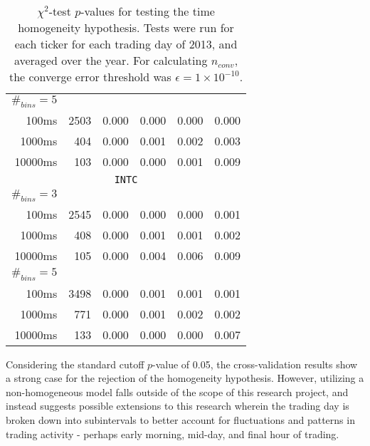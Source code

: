 \begin{sidewaystable}
\begin{tabular}{@{}rrrrrr@{}}
$\#_{bins}=5$ &&&&& \\
100ms &  2503 & 0.000 & 0.000 & 0.000 & 0.000 \\
1000ms &  404 & 0.000 & 0.001 & 0.002 & 0.003 \\
10000ms & 103 & 0.000 & 0.000 & 0.001 & 0.009 \\
\multicolumn{6}{c}{\texttt{INTC}} \\
$\#_{bins}=3$ &&&&& \\
100ms &  2545 & 0.000 & 0.000 & 0.000 & 0.001 \\
1000ms &  408 & 0.000 & 0.001 & 0.001 & 0.002 \\
10000ms & 105 & 0.000 & 0.004 & 0.006 & 0.009 \\
$\#_{bins}=5$ &&&&& \\
100ms &  3498 & 0.000 & 0.001 & 0.001 & 0.001 \\
1000ms &  771 & 0.000 & 0.001 & 0.002 & 0.002 \\
10000ms & 133 & 0.000 & 0.000 & 0.000 & 0.007 \\
\bottomrule
\end{tabular}
\caption{$\chi^2$-test $p$-values for testing the time homogeneity hypothesis. Tests were run for each ticker for each trading day of 2013, and averaged over the year. For calculating $n_{conv}$, the converge error threshold was $\epsilon = 1\times 10^{-10}$.}
\label{tbl:pvalues}
\end{sidewaystable}
Considering the standard cutoff $p$-value of 0.05, the cross-validation results show a strong case for the rejection of the homogeneity hypothesis. However, utilizing a non-homogeneous model falls outside of the scope of this research project, and instead suggests possible extensions to this research wherein the trading day is broken down into subintervals to better account for fluctuations and patterns in trading activity - perhaps early morning, mid-day, and final hour of trading.

